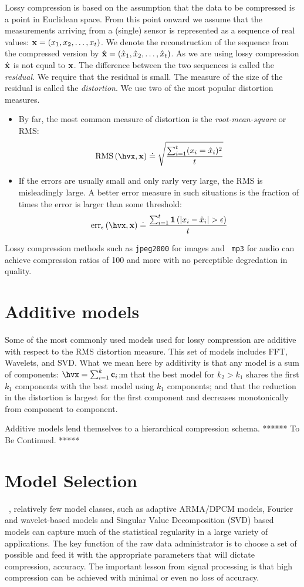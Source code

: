 Lossy compression is based on the assumption that the data to be
compressed is a point in Euclidean space. From this point onward we
assume that the measurements arriving from a (single) sensor is
represented as a sequence of real values: $\mathbf{x}=(x_1,x_2,\ldots,x_t)$.
We denote the reconstruction of the sequence from the compressed
version by $\hat{\mathbf{x}}=(\hat{x}_1,\hat{x}_2,\ldots,\hat{x}_t)$. As we are using lossy
compression $\hat{\mathbf{x}}$ is not equal to $\mathbf{x}$. The difference between
the two sequences is called the {\em residual}. We require that the
residual is small. The measure of the size of the residual is called
the {\em distortion}. We use two of the most popular distortion
measures.
\begin{itemize}
\item By far, the most common measure of distortion is the {\em root-mean-square}
or RMS:
\[
\mbox{RMS}\left(\hvx,\vx \right)
\doteq \sqrt{\frac{\sum_{i=1}^t (x_i =\hx_i)^2}{t}}
\]
\item If the errors are usually small and only rarly very large,
the RMS is misleadingly large. A better error measure in such
situations is the fraction of times the error is larger
than some threshold:
\[
\mbox{err}_{\epsilon}\left(\hvx,\vx \right)
\doteq \frac{\sum_{i=1}^t \mathbf{1}\left(|x_i-\hx_i|>\epsilon \right)}{t}
\]
\end{itemize}
Lossy compression methods such as {\tt jpeg2000} for images and {\tt
  mp3} for audio can achieve compression ratios of 100 and more
with no perceptible degredation in quality.

\section{Additive models}
Some of the most commonly used models used for lossy compression are
additive with respect to the RMS distortion measure. This set of
models includes FFT, Wavelets, and SVD. What we mean here by
additivity is that any model is a sum of components: $\hvx =
\sum_{i=1}^k \vc_i$;m that the best model for $k_2>k_1$ shares the
first $k_1$ components with the best model using $k_1$ components; and
that the reduction in the distortion is largest for the first component
and decreases monotonically from component to component.

Additive models lend themselves to a hierarchical compression
schema. ****** To Be Continued. *****


\section{Model Selection}
\label{sec:Model Selection}
~\cite{Sayood12},
relatively few model classes, such as adaptive ARMA/DPCM models,
Fourier and wavelet-based models and Singular Value Decomposition
(SVD) based models can capture much of the statistical regularity in a
large variety of applications. The key
function of the raw data administrator is to choose a set of possible 
and feed it with the appropriate parameters that
will dictate compression, accuracy. The important lesson from signal
processing is that high compression can be achieved with minimal or
even no loss of accuracy.

